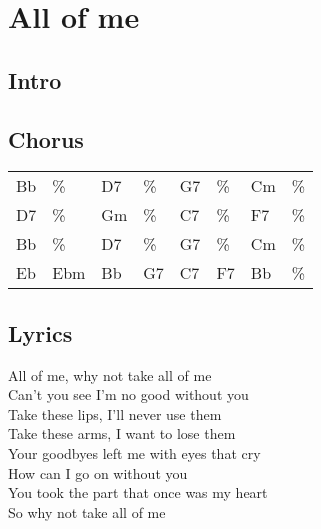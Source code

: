 \section{All of me}


\subsection*{Intro}


\subsection*{Chorus}


\begin{tabular}{l l l l l l l l}
Bb & \% & D7 & \% & G7 & \% & Cm & \% \\ 
D7 & \% & Gm & \% & C7 & \% & F7 & \% \\ 
Bb & \% & D7 & \% & G7 & \% & Cm & \% \\ 
Eb & Ebm & Bb & G7 & C7 & F7 & Bb & \% \\ 
\end{tabular}


\subsection*{Lyrics}


All of me, why not take all of me \\ 
Can't you see I'm no good without you \\ 
Take these lips, I'll never use them \\ 
Take these arms, I want to lose them \\ 
Your goodbyes left me with eyes that cry \\ 
How can I go on without you \\ 
You took the part that once was my heart \\ 
So why not take all of me \\ 
